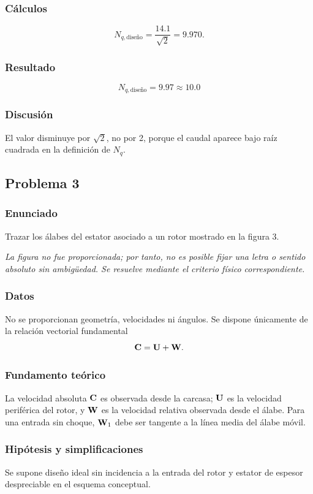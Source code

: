 \documentclass[12pt]{article}
\newcommand{\figuraFaltante}{\emph{La figura no fue proporcionada; por tanto, no es posible fijar una letra o sentido absoluto sin ambigüedad. Se resuelve mediante el criterio físico correspondiente.}}
\newcommand{\resultado}[1]{\[
  \boxed{\displaystyle #1}
\]}
\begin{document}
\subsubsection*{Cálculos}
\[
N_{q,\text{diseño}}=\frac{14.1}{\sqrt{2}}=9.970.
\]

\subsubsection*{Resultado}
\resultado{N_{q,\text{diseño}}=9.97\approx 10.0}

\subsubsection*{Discusión}
El valor disminuye por $\sqrt{2}$, no por 2, porque el caudal aparece bajo raíz cuadrada en
la definición de $N_q$.

\subsection{Problema 3}

\subsubsection*{Enunciado}
Trazar los álabes del estator asociado a un rotor mostrado en la figura 3.

\figuraFaltante

\subsubsection*{Datos}
No se proporcionan geometría, velocidades ni ángulos. Se dispone únicamente de la relación
vectorial fundamental
\[
\vb C=\vb U+\vb W.
\]

\subsubsection*{Fundamento teórico}
La velocidad absoluta $\vb C$ es observada desde la carcasa; $\vb U$ es la velocidad
periférica del rotor, y $\vb W$ es la velocidad relativa observada desde el álabe. Para una
entrada sin choque, $\vb W_1$ debe ser tangente a la línea media del álabe móvil.

\subsubsection*{Hipótesis y simplificaciones}
Se supone diseño ideal sin incidencia a la entrada del rotor y estator de espesor despreciable
en el esquema conceptual.
\end{document}
